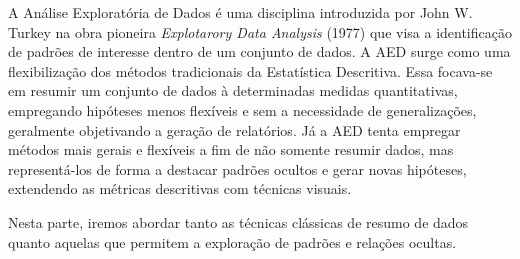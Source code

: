A Análise Exploratória de Dados é uma disciplina introduzida por John W. Turkey
na obra pioneira \textit{Explotarory Data Analysis} (1977) que visa a identificação de
padrões de interesse dentro de um conjunto de dados.
A AED surge como uma flexibilização dos métodos tradicionais da Estatística Descritiva.
Essa focava-se em resumir um conjunto de dados à determinadas medidas quantitativas,
empregando hipóteses menos flexíveis e sem a necessidade de generalizações,
geralmente objetivando a geração de relatórios.
Já a AED tenta empregar métodos mais gerais e flexíveis a fim de não somente resumir dados,
mas representá-los de forma a destacar padrões ocultos e gerar novas hipóteses, extendendo
as métricas descritivas com técnicas visuais.

Nesta parte, iremos abordar tanto as técnicas clássicas de resumo de dados quanto aquelas
que permitem a exploração de padrões e relações ocultas.
